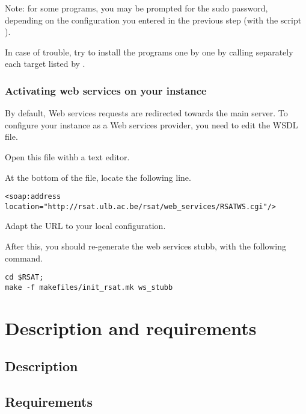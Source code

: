 \documentclass[12pt,a4paper, oneside]{scrreprt} %
\begin{document}
Note: for some programs, you may be prompted for the sudo password,
depending on the configuration you entered in the previous step (with
the script ).

In case of trouble, try to install the programs one by one by calling
separately each target listed by .



\subsection{Activating web services on your \RSAT instance}

By default, Web services requests are redirected towards the main
\RSAT server. To configure your \RSAT instance as a Web services
provider, you need to edit the WSDL file.

Open this file withb a text editor.


At the bottom of the file, locate the following line.

\begin{footnotesize}
\begin{verbatim}
<soap:address location="http://rsat.ulb.ac.be/rsat/web_services/RSATWS.cgi"/>
\end{verbatim}
\end{footnotesize}

Adapt the URL to your local configuration.

After this, you should re-generate the web services stubb, with the
following command.

  \begin{lstlisting}
cd $RSAT; 
make -f makefiles/init_rsat.mk ws_stubb
  \end{lstlisting}



\chapter{Description and requirements}

\section{Description}


\section{Requirements}
\end{document}
